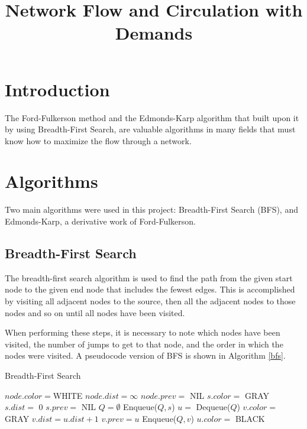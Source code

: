 \documentclass[conference]{IEEEtran}
\begin{document}
\title{Network Flow and Circulation with Demands}


\author{}

\maketitle


\section{Introduction}
The Ford-Fulkerson method and the Edmonds-Karp algorithm that built upon it
by using Breadth-First Search, are valuable algorithms in many fields that 
must know how to maximize the flow through a network.

\section{Algorithms}\label{algo}
Two main algorithms were used in this project: Breadth-First Search (BFS),
and Edmonds-Karp, a derivative work of Ford-Fulkerson.

\subsection{Breadth-First Search}
The breadth-first search algorithm is used to find the path from the given
start node to the given end node that includes the fewest edges. This is 
accomplished by visiting all adjacent nodes to the source, then all the 
adjacent nodes to those nodes and so on until all nodes have been visited.

When performing these steps, it is necessary to note which nodes have been 
visited, the number of jumps to get to that node, and the order in which 
the nodes were visited. A pseudocode version of BFS is shown in 
Algorithm \ref{bfs}. 

\begin{algorithm}
\caption{Breadth-First Search \cite{b1}}\label{bfs}
   \begin{algorithmic}[1]
     \label{bfs_init_loop}
        \State $node.color = $WHITE
        \State $node.dist = \infty$
        \State $node.prev =$ NIL
    \EndFor
    \State $s.color =$ GRAY
    \State $s.dist =$ 0
    \State $s.prev =$ NIL
    \State $Q = \emptyset$
    \State Enqueue($Q, s$)
     \label{bfs_while_loop}
    	\State $u =$ Dequeue($Q$)
    	 \label{bfs_nested_for}
    			\State $v.color =$ GRAY
    			\State $v.dist = u.dist + 1$
    			\State $v.prev = u$
    			\State Enqueue($Q, v$)
    		\EndIf
    	\EndFor
		\State $u.color =$ BLACK
    \EndWhile
    \EndFunction
   \end{algorithmic}
\end{algorithm} 
\end{document}
